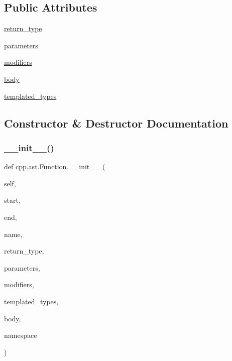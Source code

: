 \subsection*{Public Attributes}
\begin{DoxyCompactItemize}
\item 
\mbox{\hyperlink{classcpp_1_1ast_1_1_function_af750fd788d7ab33163ee066534780212}{return\+\_\+type}}
\item 
\mbox{\hyperlink{classcpp_1_1ast_1_1_function_a0e61ef47af9cf2fd4402dbd8cab631ef}{parameters}}
\item 
\mbox{\hyperlink{classcpp_1_1ast_1_1_function_ad30eed435f1ff9ff34ade9cc0d7be121}{modifiers}}
\item 
\mbox{\hyperlink{classcpp_1_1ast_1_1_function_a8e25e5016b23b38e32acf2df529c0650}{body}}
\item 
\mbox{\hyperlink{classcpp_1_1ast_1_1_function_a57bb03218bade3240137a0d91c467cb6}{templated\+\_\+types}}
\end{DoxyCompactItemize}


\subsection{Constructor \& Destructor Documentation}
\mbox{\label{classcpp_1_1ast_1_1_function_ab5270f5d353ec5e9dcd136e4cc6c7f6c}} 
\subsubsection{\texorpdfstring{\_\_init\_\_()}{\_\_init\_\_()}}
{\footnotesize\ttfamily def cpp.\+ast.\+Function.\+\_\+\+\_\+init\+\_\+\+\_\+ (\begin{DoxyParamCaption}\item[{}]{self,  }\item[{}]{start,  }\item[{}]{end,  }\item[{}]{name,  }\item[{}]{return\+\_\+type,  }\item[{}]{parameters,  }\item[{}]{modifiers,  }\item[{}]{templated\+\_\+types,  }\item[{}]{body,  }\item[{}]{namespace }\end{DoxyParamCaption})}



